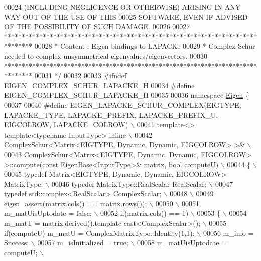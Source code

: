 \begin{DoxyCode}
00024 \textcolor{comment}{ (INCLUDING NEGLIGENCE OR OTHERWISE) ARISING IN ANY WAY OUT OF THE USE OF THIS}
00025 \textcolor{comment}{ SOFTWARE, EVEN IF ADVISED OF THE POSSIBILITY OF SUCH DAMAGE.}
00026 \textcolor{comment}{}
00027 \textcolor{comment}{ ********************************************************************************}
00028 \textcolor{comment}{ *   Content : Eigen bindings to LAPACKe}
00029 \textcolor{comment}{ *    Complex Schur needed to complex unsymmetrical eigenvalues/eigenvectors.}
00030 \textcolor{comment}{ ********************************************************************************}
00031 \textcolor{comment}{*/}
00032 
00033 \textcolor{preprocessor}{#ifndef EIGEN\_COMPLEX\_SCHUR\_LAPACKE\_H}
00034 \textcolor{preprocessor}{#define EIGEN\_COMPLEX\_SCHUR\_LAPACKE\_H}
00035 
00036 \textcolor{keyword}{namespace }\hyperlink{namespace_eigen}{Eigen} \{ 
00037 
00040 \textcolor{preprocessor}{#define EIGEN\_LAPACKE\_SCHUR\_COMPLEX(EIGTYPE, LAPACKE\_TYPE, LAPACKE\_PREFIX, LAPACKE\_PREFIX\_U, EIGCOLROW,
       LAPACKE\_COLROW) \(\backslash\)}
00041 \textcolor{preprocessor}{template<> template<typename InputType> inline \(\backslash\)}
00042 \textcolor{preprocessor}{ComplexSchur<Matrix<EIGTYPE, Dynamic, Dynamic, EIGCOLROW> >& \(\backslash\)}
00043 \textcolor{preprocessor}{ComplexSchur<Matrix<EIGTYPE, Dynamic, Dynamic, EIGCOLROW> >::compute(const EigenBase<InputType>& matrix,
       bool computeU) \(\backslash\)}
00044 \textcolor{preprocessor}{\{ \(\backslash\)}
00045 \textcolor{preprocessor}{  typedef Matrix<EIGTYPE, Dynamic, Dynamic, EIGCOLROW> MatrixType; \(\backslash\)}
00046 \textcolor{preprocessor}{  typedef MatrixType::RealScalar RealScalar; \(\backslash\)}
00047 \textcolor{preprocessor}{  typedef std::complex<RealScalar> ComplexScalar; \(\backslash\)}
00048 \textcolor{preprocessor}{\(\backslash\)}
00049 \textcolor{preprocessor}{  eigen\_assert(matrix.cols() == matrix.rows()); \(\backslash\)}
00050 \textcolor{preprocessor}{\(\backslash\)}
00051 \textcolor{preprocessor}{  m\_matUisUptodate = false; \(\backslash\)}
00052 \textcolor{preprocessor}{  if(matrix.cols() == 1) \(\backslash\)}
00053 \textcolor{preprocessor}{  \{ \(\backslash\)}
00054 \textcolor{preprocessor}{    m\_matT = matrix.derived().template cast<ComplexScalar>(); \(\backslash\)}
00055 \textcolor{preprocessor}{    if(computeU)  m\_matU = ComplexMatrixType::Identity(1,1); \(\backslash\)}
00056 \textcolor{preprocessor}{      m\_info = Success; \(\backslash\)}
00057 \textcolor{preprocessor}{      m\_isInitialized = true; \(\backslash\)}
00058 \textcolor{preprocessor}{      m\_matUisUptodate = computeU; \(\backslash\)}

\end{DoxyCode}
